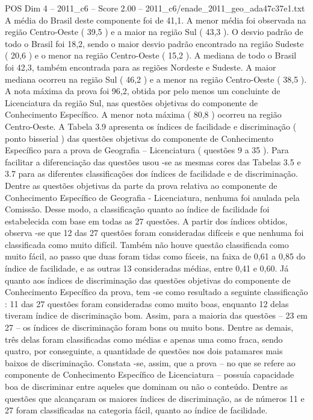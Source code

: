 \begin{textsample}{POS Dim 4 – 2011\_c6 – Score 2.00 – 2011\_c6/enade\_2011\_geo\_ada47c37e1.txt}
A média do Brasil deste componente foi de 41,1.
A menor média foi observada na região Centro-Oeste ( 39,5 ) e a maior na região Sul ( 43,3 ).
O desvio padrão de todo o Brasil foi 18,2, sendo o maior desvio padrão encontrado na região Sudeste ( 20,6 ) e o menor na região Centro-Oeste ( 15,2 ).
A mediana de todo o Brasil foi 42,3, também encontrada para as regiões Nordeste e Sudeste.
A maior mediana ocorreu na região Sul ( 46,2 ) e a menor na região Centro-Oeste ( 38,5 ).
A nota máxima da prova foi 96,2, obtida por pelo menos um concluinte de Licenciatura da região Sul, nas questões objetivas do componente de Conhecimento Específico.
A menor nota máxima ( 80,8 ) ocorreu na região Centro-Oeste.
A Tabela 3.9 apresenta os índices de facilidade e discriminação ( ponto bisserial ) das questões objetivas do componente de Conhecimento Específico para a prova de Geografia – Licenciatura ( questões 9 a 35 ).
Para facilitar a diferenciação das questões usou -se as mesmas cores das Tabelas 3.5 e 3.7 para as diferentes classificações dos índices de facilidade e de discriminação.
Dentre as questões objetivas da parte da prova relativa ao componente de Conhecimento Específico de Geografia - Licenciatura, nenhuma foi anulada pela Comissão.
Desse modo, a classificação quanto ao índice de facilidade foi estabelecida com base em todas as 27 questões.
A partir dos índices obtidos, observa -se que 12 das 27 questões foram consideradas difíceis e que nenhuma foi classificada como muito difícil.
Também não houve questão classificada como muito fácil, ao passo que duas foram tidas como fáceis, na faixa de 0,61 a 0,85 do índice de facilidade, e as outras 13 consideradas médias, entre 0,41 e 0,60.
Já quanto aos índices de discriminação das questões objetivas do componente de Conhecimento Específico da prova, tem -se como resultado a seguinte classificação : 11 das 27 questões foram consideradas como muito boas, enquanto 12 delas tiveram índice de discriminação bom.
Assim, para a maioria das questões – 23 em 27 – os índices de discriminação foram bons ou muito bons.
Dentre as demais, três delas foram classificadas como médias e apenas uma como fraca, sendo quatro, por conseguinte, a quantidade de questões nos dois patamares mais baixos de discriminação.
Constata -se, assim, que a prova – no que se refere ao componente de Conhecimento Específico de Licenciatura – possuía capacidade boa de discriminar entre aqueles que dominam ou não o conteúdo.
Dentre as questões que alcançaram os maiores índices de discriminação, as de números 11 e 27 foram classificadas na categoria fácil, quanto ao índice de facilidade.

\end{textsample}
